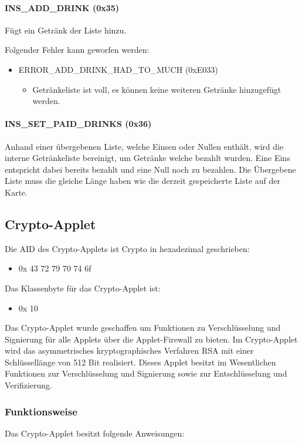 \paragraph{INS\_ADD\_DRINK (0x35)}
Fügt ein Getränk der Liste hinzu.

Folgender Fehler kann geworfen werden:
\begin{itemize}
	\item ERROR\_ADD\_DRINK\_HAD\_TO\_MUCH (0xE033)
	\begin{itemize}
		\item Getränkeliste ist voll, es können keine weiteren Getränke hinzugefügt werden.
	\end{itemize}
\end{itemize}

\paragraph{INS\_SET\_PAID\_DRINKS (0x36)}
Anhand einer übergebenen Liste, welche Einsen oder Nullen enthält, wird die interne Getränkeliste bereinigt, um Getränke welche bezahlt wurden.
Eine Eins entspricht dabei bereits bezahlt und eine Null noch zu bezahlen.
Die Übergebene Liste muss die gleiche Länge haben wie die derzeit gespeicherte Liste auf der Karte.

\subsection{Crypto-Applet}
Die AID des Crypto-Applets ist Crypto in hexadezimal geschrieben:
\begin{itemize}
	\item 0x 43 72 79 70 74 6f
\end{itemize}
Das Klassenbyte für das Crypto-Applet ist:
\begin{itemize}
	\item 0x 10
\end{itemize}

Das Crypto-Applet wurde geschaffen um Funktionen zu Verschlüsselung und Signierung für alle Applets über die Applet-Firewall zu bieten.
Im Crypto-Applet wird das asymmetrisches kryptographisches Verfahren RSA mit einer Schlüssellänge von 512 Bit realisiert.
Dieses Applet besitzt im Wesentlichen Funktionen zur Verschlüsselung und Signierung sowie zur Entschlüsselung und Verifizierung.

\subsubsection{Funktionsweise}
Das Crypto-Applet besitzt folgende Anweisungen:
